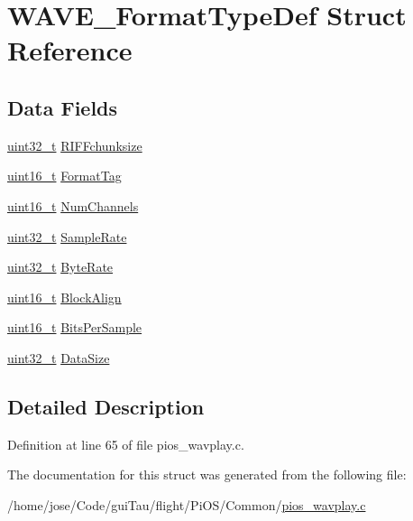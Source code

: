 \hypertarget{struct_w_a_v_e___format_type_def}{\section{W\-A\-V\-E\-\_\-\-Format\-Type\-Def Struct Reference}
\label{struct_w_a_v_e___format_type_def}
}
\subsection*{Data Fields}
\begin{DoxyCompactItemize}
\item 
\hyperlink{stdint_8h_a435d1572bf3f880d55459d9805097f62}{uint32\-\_\-t} \hyperlink{group___w_a_v_e_p_l_a_y_e_r___private___variables_gaeaf1fe0b90f1ff0c7c4bc845e47fe7c5}{R\-I\-F\-Fchunksize}
\item 
\hyperlink{stdint_8h_a273cf69d639a59973b6019625df33e30}{uint16\-\_\-t} \hyperlink{group___w_a_v_e_p_l_a_y_e_r___private___variables_gaa0d6b4c06edc073395827674b4345820}{Format\-Tag}
\item 
\hyperlink{stdint_8h_a273cf69d639a59973b6019625df33e30}{uint16\-\_\-t} \hyperlink{group___w_a_v_e_p_l_a_y_e_r___private___variables_ga2bdeb90779a17e644107a5d855f4d344}{Num\-Channels}
\item 
\hyperlink{stdint_8h_a435d1572bf3f880d55459d9805097f62}{uint32\-\_\-t} \hyperlink{group___w_a_v_e_p_l_a_y_e_r___private___variables_ga4f574183b180c6eee94ec82826583941}{Sample\-Rate}
\item 
\hyperlink{stdint_8h_a435d1572bf3f880d55459d9805097f62}{uint32\-\_\-t} \hyperlink{group___w_a_v_e_p_l_a_y_e_r___private___variables_ga6f4f0874858518ee7ae3a7beb6bf9f34}{Byte\-Rate}
\item 
\hyperlink{stdint_8h_a273cf69d639a59973b6019625df33e30}{uint16\-\_\-t} \hyperlink{group___w_a_v_e_p_l_a_y_e_r___private___variables_ga50c6bfe090b579d0b94ee9950bb7a03f}{Block\-Align}
\item 
\hyperlink{stdint_8h_a273cf69d639a59973b6019625df33e30}{uint16\-\_\-t} \hyperlink{group___w_a_v_e_p_l_a_y_e_r___private___variables_gaed7cbe094ecca9b29332a1209f88a535}{Bits\-Per\-Sample}
\item 
\hyperlink{stdint_8h_a435d1572bf3f880d55459d9805097f62}{uint32\-\_\-t} \hyperlink{group___w_a_v_e_p_l_a_y_e_r___private___variables_ga25442a9c895536fb4a7837811a8fe810}{Data\-Size}
\end{DoxyCompactItemize}


\subsection{Detailed Description}


Definition at line 65 of file pios\-\_\-wavplay.\-c.



The documentation for this struct was generated from the following file\-:\begin{DoxyCompactItemize}
\item 
/home/jose/\-Code/gui\-Tau/flight/\-Pi\-O\-S/\-Common/\hyperlink{pios__wavplay_8c}{pios\-\_\-wavplay.\-c}\end{DoxyCompactItemize}
